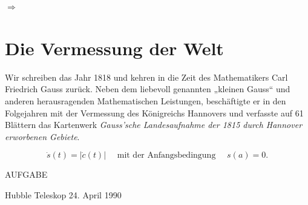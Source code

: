 \begin{refsection}
$\Rightarrow$



\section{Die Vermessung der Welt}
Wir schreiben das Jahr 1818 und kehren in die Zeit des Mathematikers Carl Friedrich Gauss zurück. Neben dem liebevoll genannten „kleinen Gauss“ und anderen herausragenden Mathematischen Leistungen, beschäftigte er in den Folgejahren mit der Vermessung des Königreichs Hannovers und verfasste auf 61 Blättern das Kartenwerk \textit{Gauss’sche Landesaufnahme der 1815 durch Hannover erworbenen Gebiete}.
\cite{skript:tabea}


\begin{equation}
\dot s(t)=|\dot c(t)|
\quad
\text{ mit der Anfangsbedingung }\quad s(a)=0.
\label{skript:kruemmung:laengedgl}
\end{equation}


\cite{lin1973}


AUFGABE

Hubble Teleskop 
24. April 1990




\printbibliography[heading=subbibliography]
\end{refsection}



